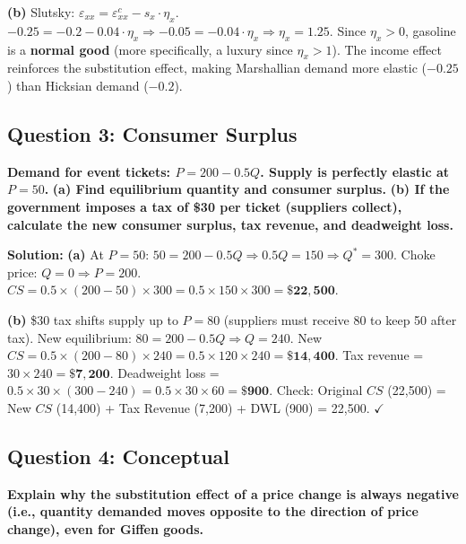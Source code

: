 \documentclass[10pt,a4paper]{article}
\begin{document}
\begin{multicols}{2}
\textbf{(b)} Slutsky: $\varepsilon_{xx} = \varepsilon_{xx}^c - s_x \cdot \eta_x$.
$-0.25 = -0.2 - 0.04 \cdot \eta_x \Rightarrow -0.05 = -0.04 \cdot \eta_x \Rightarrow \eta_x = \mathbf{1.25}$.
Since $\eta_x > 0$, gasoline is a \textbf{normal good} (more specifically, a luxury since $\eta_x > 1$). The income effect reinforces the substitution effect, making Marshallian demand more elastic ($-0.25$) than Hicksian demand ($-0.2$).

\vspace{0.2cm}

\subsection*{Question 3: Consumer Surplus}
\textbf{Demand for event tickets: $P = 200 - 0.5Q$. Supply is perfectly elastic at $P=50$.}
\textbf{(a) Find equilibrium quantity and consumer surplus.}
\textbf{(b) If the government imposes a tax of \$30 per ticket (suppliers collect), calculate the new consumer surplus, tax revenue, and deadweight loss.}

\vspace{0.1cm}
\textbf{Solution:}
\textbf{(a)} At $P=50$: $50 = 200 - 0.5Q \Rightarrow 0.5Q = 150 \Rightarrow Q^* = 300$.
Choke price: $Q=0 \Rightarrow P=200$. $CS = 0.5 \times (200-50) \times 300 = 0.5 \times 150 \times 300 = \mathbf{\$22,500}$.

\textbf{(b)} \$30 tax shifts supply up to $P=80$ (suppliers must receive 80 to keep 50 after tax). New equilibrium: $80 = 200 - 0.5Q \Rightarrow Q=240$. New $CS = 0.5 \times (200-80) \times 240 = 0.5 \times 120 \times 240 = \mathbf{\$14,400}$.
Tax revenue = $30 \times 240 = \mathbf{\$7,200}$.
Deadweight loss = $0.5 \times 30 \times (300-240) = 0.5 \times 30 \times 60 = \mathbf{\$900}$.
Check: Original $CS$ (22,500) = New $CS$ (14,400) + Tax Revenue (7,200) + DWL (900) = 22,500. $\checkmark$

\vspace{0.2cm}

\subsection*{Question 4: Conceptual}
\textbf{Explain why the substitution effect of a price change is always negative (i.e., quantity demanded moves opposite to the direction of price change), even for Giffen goods.}


\end{multicols}
\end{document}
